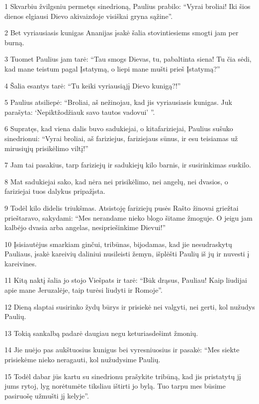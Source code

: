 \par 1 Skvarbiu žvilgsniu permetęs sinedrioną, Paulius prabilo: “Vyrai broliai! Iki šios dienos elgiausi Dievo akivaizdoje visiškai gryna sąžine”. 
\par 2 Bet vyriausiasis kunigas Ananijas įsakė šalia stovintiesiems smogti jam per burną. 
\par 3 Tuomet Paulius jam tarė: “Tau smogs Dievas, tu, pabaltinta siena! Tu čia sėdi, kad mane teistum pagal Įstatymą, o liepi mane mušti prieš Įstatymą?” 
\par 4 Šalia esantys tarė: “Tu keiki vyriausiąjį Dievo kunigą?!” 
\par 5 Paulius atsiliepė: “Broliai, aš nežinojau, kad jis vyriausiasis kunigas. Juk parašyta: ‘Nepiktžodžiauk savo tautos vadovui’ ”. 
\par 6 Supratęs, kad viena dalis buvo sadukiejai, o kita­fariziejai, Paulius sušuko sinedrionui: “Vyrai broliai, aš fariziejus, fariziejaus sūnus, ir esu teisiamas už mirusiųjų prisikėlimo viltį!” 
\par 7 Jam tai pasakius, tarp fariziejų ir sadukiejų kilo barnis, ir susirinkimas suskilo. 
\par 8 Mat sadukiejai sako, kad nėra nei prisikėlimo, nei angelų, nei dvasios, o fariziejai tuos dalykus pripažįsta. 
\par 9 Todėl kilo didelis triukšmas. Atsistoję fariziejų pusės Rašto žinovai griežtai prieštaravo, sakydami: “Mes nerandame nieko blogo šitame žmoguje. O jeigu jam kalbėjo dvasia arba angelas, nesipriešinkime Dievui!” 
\par 10 Įsisiautėjus smarkiam ginčui, tribūnas, bijodamas, kad jie nesudraskytų Pauliaus, įsakė kareivių daliniui nusileisti žemyn, išplėšti Paulių iš jų ir nuvesti į kareivines. 
\par 11 Kitą naktį šalia jo stojo Viešpats ir tarė: “Būk drąsus, Pauliau! Kaip liudijai apie mane Jeruzalėje, taip turėsi liudyti ir Romoje”. 
\par 12 Dieną slaptai susirinko žydų būrys ir prisiekė nei valgyti, nei gerti, kol nužudys Paulių. 
\par 13 Tokią sankalbą padarė daugiau negu keturiasdešimt žmonių. 
\par 14 Jie nuėjo pas aukštuosius kunigus bei vyresniuosius ir pasakė: “Mes siekte prisiekėme nieko neragauti, kol nužudysime Paulių. 
\par 15 Todėl dabar jūs kartu su sinedrionu prašykite tribūną, kad jis pristatytų jį jums rytoj, lyg norėtumėte tiksliau ištirti jo bylą. Tuo tarpu mes būsime pasiruošę užmušti jį kelyje”. 
